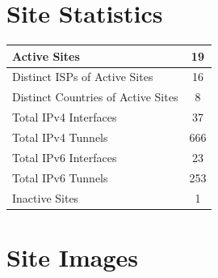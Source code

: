 \chapter{Site Statistics}
\label{cha:Site-Statistics}


\begin{small}
\begin{center}
\begin{longtable}{|c|c|}
 \hline
 \multicolumn{1}{|l|}{Active Sites} & 19 \\ \hline
 \multicolumn{1}{|l|}{Distinct ISPs of Active Sites} & 16 \\ \hline
 \multicolumn{1}{|l|}{Distinct Countries of Active Sites} & 8 \\ \hline
 \multicolumn{1}{|l|}{Total IPv4 Interfaces} & 37 \\ \hline
 \multicolumn{1}{|l|}{Total IPv4 Tunnels} & 666 \\ \hline
 \multicolumn{1}{|l|}{Total IPv6 Interfaces} & 23 \\ \hline
 \multicolumn{1}{|l|}{Total IPv6 Tunnels} & 253 \\ \hline
 \multicolumn{1}{|l|}{Inactive Sites} & 1 \\ \hline
\end{longtable}
\end{center}
\end{small}




\chapter{Site Images}
\label{cha:Images}


